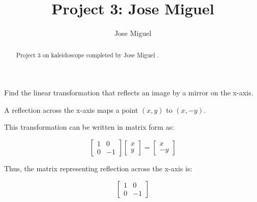 \documentclass{ximera}
\title{Project 3: Jose Miguel}
\author{Jose Miguel}
\begin{document}
\begin{abstract}
    Project 3 on kaleidoscope completed by Jose Miguel .
\end{abstract}

\maketitle

\begin{problem}
   Find the linear transformation that reflects an image by a mirror on the x-axis.
   
   \vspace{0.3cm}
   
  A reflection across the x-axis maps a point $(x, y)$ to $(x, -y)$.


     \vspace{0.3cm}

This transformation can be written in matrix form as:

    \[
        \begin{bmatrix}
           1 & 0 \\
           0 & -1
        \end{bmatrix}
        \begin{bmatrix}
           x \\
           y
        \end{bmatrix}
           =
        \begin{bmatrix}
           x \\
           - y
        \end{bmatrix}
    \]

     \vspace{0.3cm}

Thus, the matrix representing reflection across the x-axis is:

\[
        \begin{bmatrix}
           1 & 0 \\
           0 & -1
        \end{bmatrix}
\]
        \end{problem}

    \vspace{0.5cm}
\end{document}
